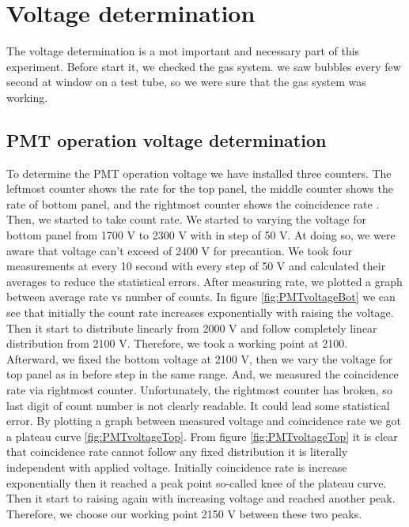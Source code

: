\clearpage
\section{Voltage determination}\label{sec:vol}
The voltage determination is a mot important and necessary part of this experiment. Before start it, we checked the gas system. we saw bubbles every few second at window on a test tube, so we were sure that the gas system was working.

\subsection{PMT operation voltage determination}
To determine the PMT operation voltage we have installed three counters. The leftmost counter shows the rate for the top panel, the middle counter shows the rate of bottom panel, and the rightmost counter shows the coincidence rate \cite{manual}. Then, we started to take count rate. We started to varying the voltage for bottom panel from \num{1700} V to \num{2300} V with in step of \num{50} V. At doing so, we were aware that voltage can't exceed of \num{2400} V for precaution. We took four measurements at every \num{10} second with every step of \num{50} V and calculated their averages to reduce the statistical errors. After measuring rate, we plotted a graph between average rate vs number of counts. In figure \ref{fig:PMTvoltageBot} we can see that initially the count rate increases exponentially with raising the voltage. Then it start to distribute linearly from 2000 V and follow completely linear distribution from \num{2100} V. Therefore, we took a working point at \num{2100}.\\

Afterward, we fixed the bottom voltage at \num{2100} V, then we vary the voltage for top panel as in before step in the same range. And, we measured the coincidence rate via rightmost counter. Unfortunately, the rightmost counter has broken, so last digit of count number is not clearly readable. It could lead some statistical error. By plotting a graph between measured voltage and coincidence rate we got a plateau curve \ref{fig:PMTvoltageTop}. From figure \ref{fig:PMTvoltageTop} it is clear that coincidence rate cannot follow any fixed distribution it is literally independent with applied voltage. Initially coincidence rate is increase exponentially then it reached a peak point so-called knee of the plateau curve. Then it start to raising again with increasing voltage and reached another peak. Therefore, we choose our working point \num{2150} V between these two peaks.

